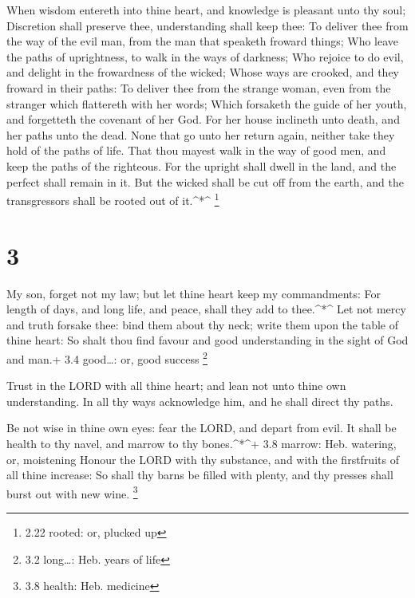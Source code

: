  When wisdom entereth into thine heart, and knowledge is
pleasant unto thy soul;  Discretion shall preserve thee,
understanding shall keep thee:  To deliver thee from the
way of the evil man, from the man that speaketh froward things;
 Who leave the paths of uprightness, to walk in the ways of
darkness;  Who rejoice to do evil, and delight in the
frowardness of the wicked;  Whose ways are crooked, and
they froward in their paths:  To deliver thee from the
strange woman, even from the stranger which flattereth with her words;
 Which forsaketh the guide of her youth, and forgetteth the
covenant of her God.  For her house inclineth unto death,
and her paths unto the dead.  None that go unto her return
again, neither take they hold of the paths of life.  That
thou mayest walk in the way of good men, and keep the paths of the
righteous.  For the upright shall dwell in the land, and
the perfect shall remain in it.  But the wicked shall be
cut off from the earth, and the transgressors shall be rooted out of
it.\^{}*\^{} \footnote{2.22 rooted: or, plucked up}

\hypertarget{section-2}{%
\section{3}\label{section-2}}

 My son, forget not my law; but let thine heart keep my
commandments:  For length of days, and long life, and peace,
shall they add to thee.\^{}*\^{}  Let not mercy and truth
forsake thee: bind them about thy neck; write them upon the table of
thine heart:  So shalt thou find favour and good
understanding in the sight of God and man.+ 3.4 good\ldots: or, good
success \footnote{3.2 long\ldots: Heb. years of life}

 Trust in the LORD with all thine heart; and lean not unto
thine own understanding.  In all thy ways acknowledge him,
and he shall direct thy paths.

 Be not wise in thine own eyes: fear the LORD, and depart
from evil.  It shall be health to thy navel, and marrow to
thy bones.\^{}*\^{}+ 3.8 marrow: Heb. watering, or, moistening
 Honour the LORD with thy substance, and with the
firstfruits of all thine increase:  So shall thy barns be
filled with plenty, and thy presses shall burst out with new wine.
\footnote{3.8 health: Heb. medicine}

